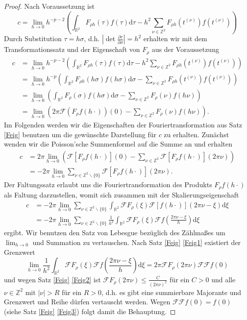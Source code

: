 \documentclass[12pt,a4paper]{scrartcl}
\newcommand{\dd}{\mathrm{d}}
\numberwithin{equation}{section}
\newcommand{\R}{\mathbb{R}} %
\newcommand{\Z}{\mathbb{Z}} %
\newcommand{\F}{\mathcal{F}} %
\begin{document}
\begin{proof}
Nach Voraussetzung ist  
\[
c = \lim_{h \to 0} h^{-p-2} \left( \int_{\R^2} F_{\rho h}(\tau)f(\tau) \dd \tau - h^2 \sum_{\nu \in \Z^2} F_{\rho h } (t^{(\nu)})f(t^{(\nu)})\right)
\]
Durch Substitution $\tau= h\sigma$, d.h. $|\det\frac{\partial \tau}{\partial \sigma}|=h^2$ erhalten wir mit dem Transformationssatz und der Eigenschaft von $F_\rho$ aus der Voraussetzung
\begin{align*}
c &= \lim_{h \to 0} h^{-p-2} \left( \int_{\R^2} F_{\rho h}(\tau)f(\tau) \dd \tau - h^2 \sum_{\nu \in \Z^2} F_{\rho h } (t^{(\nu)})f(t^{(\nu)})\right) \\
&= \lim_{h \to 0} h^{-p} \left( \int_{\R^2} F_{\rho h}(h \sigma)f(h \sigma) \dd \sigma - \sum_{\nu \in \Z^2} F_{\rho h } (t^{(\nu)})f(t^{(\nu)})\right) \\
&=\lim_{h \to 0} \left( \int_{\R^2} F_{\rho}(\sigma)f(h \sigma) \dd \sigma - \sum_{\nu \in \Z^2} F_{\rho} (\nu)f(h\nu)\right) \\
&=\lim_{h \to 0} \left( 2 \pi \F (F_\rho f(h \cdot))(0)  - \sum_{\nu \in \Z^2} F_{\rho} (\nu)f(h\nu)\right).
\end{align*}
Im Folgenden werden wir die Eigenschaften der Fouriertransformation aus Satz \ref{Feig} benutzen um die gewünschte Darstellung für $c$ zu erhalten. 
Zunächst wenden wir die Poisson'sche Summenformel auf die Summe an und erhalten
\begin{align*}
c &= 2 \pi \lim_{h \to 0} \left(\F [F_\rho f(h \cdot)](0) - \sum_{\nu \in \Z^2} \F [F_{\rho}f(h \cdot)](2 \pi \nu) \right) \\
&= - 2\pi \lim_{h \to 0}\sum_{\nu \in \Z^2 \backslash \{0\}} \F [F_{\rho}f(h \cdot)](2 \pi \nu).
\end{align*}
Der Faltungssatz erlaubt uns die Fouriertransformation des Produkts $F_{\rho}f(h \cdot)$ als Faltung darzustellen, womit sich zusammen mit der Skalierungseigenschaft
\begin{align*}
c &= - 2\pi \lim_{h \to 0}\sum_{\nu \in \Z^2 \backslash \{0\}} \int_{\R^2} \F F_{\rho}(\xi) \F [f(h \cdot)](2 \pi \nu-\xi)\dd \xi \\
&= - 2\pi \lim_{h \to 0}\sum_{\nu \in \Z^2 \backslash \{0\}}\frac{1}{h^2} \int_{\R^2} \F F_{\rho}(\xi) \F f\left(\frac{2 \pi \nu-\xi}{h}\right)\dd \xi
\end{align*}
ergibt. Wir benutzen den Satz von Lebesgue bezüglich des Zählmaßes um $\lim_{h \to 0}$ und Summation zu vertauschen. Nach Satz \ref{Feig} \eqref{Feig1} existiert der Grenzwert 
\[
\lim_{h \to 0}\frac{1}{h^2} \int_{\R^2} \F F_{\rho}(\xi) \F f\left(\frac{2 \pi \nu-\xi}{h}\right)\dd \xi = 2 \pi \F F_{\rho}(2 \pi \nu) \F \F f(0)
\]
und wegen Satz \ref{Feig} \eqref{Feig2} ist $\F F_{\rho}(2 \pi \nu) \leq \frac{C}{(2 \pi \nu)^2}$ für ein $C>0$ und alle $\nu \in \Z^2$ mit $|\nu|>R$ für ein $R>0$, d.h. es gibt eine summierbare Majorante und Grenzwert und Reihe dürfen vertauscht werden. Wegen $\F \F f(0) = f(0)$ (siehe Satz \ref{Feig} \eqref{Feig3}) folgt damit die Behauptung.
\end{proof}
\end{document}
